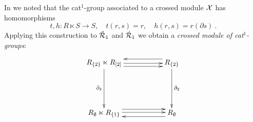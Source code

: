 
\medskip
In \cite{alp:wens-ijac} we noted that the cat$^1$-group associated to a
crossed module $\mathcal{X}$ has homomorphisms
$$
t,h : R \ltimes S \to S, \quad t(r,s) = r, \quad h(r,s) = r(\partial s)~.
$$
Applying this construction to $\ddot{\mathcal{R}}_1$ and $\dot{\mathcal{R}}_1$
we obtain a \emph{crossed module of cat$^1$-groups}:

\begin{equation} \label{eq:xmod-of-cat1s}
\vcenter{\xymatrix{
   R_{\{2\}} \ltimes R_{[2]} 
     \ar[rr]<-1.2ex> \ar[rr]<-0.2ex> \ar[dd]_{\barbdyt}
   &&  R_{\{2\}} \ar[dd]^{\dbdyt} 
     \ar[ll]<-1.2ex> \\
   &&  \\
   R_{\emptyset} \ltimes R_{\{1\}} 
     \ar[rr]<+1.2ex> \ar[rr]<+0.2ex> 
   &&  R_{\emptyset}
     \ar[ll]<+1.2ex>
}} 
\end{equation}

